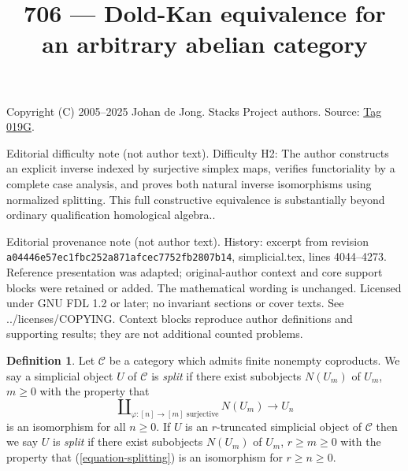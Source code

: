 \documentclass{amsart}
\theoremstyle{plain}
\theoremstyle{definition}
\newtheorem{definition}[subsection]{Definition}
\theoremstyle{remark}
\numberwithin{equation}{subsection}
\begin{document}
\title[Stacks Project, Tag 019G]{706 --- Dold-Kan equivalence for an arbitrary abelian category}
\maketitle
\noindent Copyright (C) 2005--2025 Johan de Jong. Stacks Project authors. Source: \href{https://stacks.math.columbia.edu/tag/019G}{Tag 019G}.

\noindent Editorial difficulty note (not author text). Difficulty H2: The author constructs an explicit inverse indexed by surjective simplex maps, verifies functoriality by a complete case analysis, and proves both natural inverse isomorphisms using normalized splitting. This full constructive equivalence is substantially beyond ordinary qualification homological algebra..

\noindent Editorial provenance note (not author text). History: excerpt from revision \texttt{a0444\allowbreak 6e57e\allowbreak c1fbc\allowbreak 252a8\allowbreak 71afc\allowbreak ec775\allowbreak 2fb28\allowbreak 07b14}, simplicial.tex, lines 4044--4273. Reference presentation was adapted; original-author context and core support blocks were retained or added. The mathematical wording is unchanged. Licensed under GNU FDL 1.2 or later; no invariant sections or cover texts. See ../licenses/COPYING. Context blocks reproduce author definitions and supporting results; they are not additional counted problems.

\begin{definition}
\label{definition-split}
Let $\mathcal{C}$ be a category which admits finite nonempty coproducts.
We say a simplicial object $U$ of $\mathcal{C}$ is {\it split}
if there exist subobjects $N(U_m)$ of $U_m$, $m \geq 0$
with the property that
\begin{equation}
\label{equation-splitting}
\coprod\nolimits_{\varphi : [n] \to [m]\text{ surjective}}
N(U_m)
\longrightarrow
U_n
\end{equation}
is an isomorphism for all $n \geq 0$. If $U$ is an $r$-truncated
simplicial object of $\mathcal{C}$ then we say $U$ is {\it split}
if there exist subobjects $N(U_m)$ of $U_m$, $r \geq m \geq 0$
with the property that (\ref{equation-splitting})
is an isomorphism for $r \geq n \geq 0$.
\end{definition}
\end{document}
